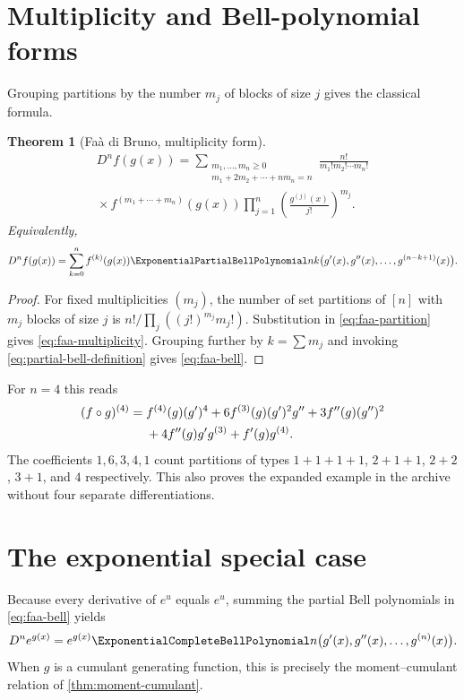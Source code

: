 \documentclass[11pt,a4paper,oneside,openany]{book}
\newtheorem{theorem}{Theorem}[chapter]
\theoremstyle{definition}
\theoremstyle{remark}
\begin{document}
\section{Multiplicity and Bell-polynomial forms}
Grouping partitions by the number $m_j$ of blocks of size $j$ gives the classical
formula.
\begin{theorem}[Fa\`a di Bruno, multiplicity form]\label{thm:faa-multiplicity}
\begin{multline}\label{eq:faa-multiplicity}
 D^n f(g(x))=
 \sum_{\substack{m_1,\ldots,m_n\ge0\\
                  m_1+2m_2+\cdots+nm_n=n}}
 \frac{n!}{m_1!m_2!\cdots m_n!}\\
 {}\times f^{(m_1+\cdots+m_n)}(g(x))
 \prod_{j=1}^{n}\left(\frac{g^{(j)}(x)}{j!}\right)^{m_j}.
\end{multline}
Equivalently,
\begin{equation}\label{eq:faa-bell}
 D^n f(g(x))=
 \sum_{k=0}^{n}f^{(k)}(g(x))
 \ExponentialPartialBellPolynomial nk\bigl(g'(x),g''(x),\ldots,g^{(n-k+1)}(x)\bigr).
\end{equation}
\end{theorem}
\begin{proof}
For fixed multiplicities $(m_j)$, the number of set partitions of $[n]$ with
$m_j$ blocks of size $j$ is
$n!/\prod_j((j!)^{m_j}m_j!)$.  Substitution in
\eqref{eq:faa-partition} gives \eqref{eq:faa-multiplicity}.  Grouping further by
$k=\sum m_j$ and invoking \eqref{eq:partial-bell-definition} gives
\eqref{eq:faa-bell}.
\end{proof}

For $n=4$ this reads
\begin{align}
 (f\circ g)^{(4)}={}&f^{(4)}(g)(g')^4
 +6f^{(3)}(g)(g')^2g''+3f''(g)(g'')^2\notag\\
 &+4f''(g)g'g^{(3)}+f'(g)g^{(4)}.
 \label{eq:faa-n4}
\end{align}
The coefficients $1,6,3,4,1$ count partitions of types
$1+1+1+1$, $2+1+1$, $2+2$, $3+1$, and $4$ respectively.  This also proves the
expanded example in the archive without four separate differentiations.

\section{The exponential special case}
Because every derivative of $e^u$ equals $e^u$, summing the partial Bell
polynomials in \eqref{eq:faa-bell} yields
\begin{equation}\label{eq:exp-faa}
 D^n e^{g(x)}=e^{g(x)}
 \ExponentialCompleteBellPolynomial n\bigl(g'(x),g''(x),\ldots,g^{(n)}(x)\bigr).
\end{equation}
When $g$ is a cumulant generating function, this is precisely the
moment--cumulant relation of \cref{thm:moment-cumulant}.
\end{document}
